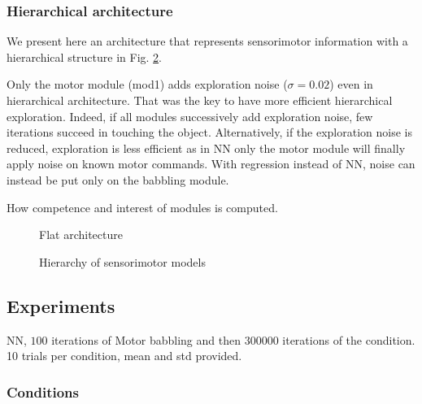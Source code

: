 \documentclass[10pt,letterpaper]{article}
\begin{document}
				
		
		\subsubsection{Hierarchical architecture}
			
			We present here an architecture that represents sensorimotor information with a hierarchical structure in Fig. \ref{H1}.
			
			Only the motor module (mod1) adds exploration noise ($\sigma=0.02$) even in hierarchical architecture. 
			That was the key to have more efficient hierarchical exploration. 
			Indeed, if all modules successively add exploration noise, few iterations succeed in touching the object. 
			Alternatively, if the exploration noise is reduced, exploration is less efficient as in NN only the motor module will finally apply noise on known motor commands. 
			With regression instead of NN, noise can instead be put only on the babbling module.
			
			How competence and interest of modules is computed.
			
			\begin{figure}[t]
				\center
				
				\caption{Flat architecture}
				\label{F}					
			\end{figure}
			
			\begin{figure}[t]
				\center
				
				\caption{Hierarchy of sensorimotor models}
				\label{H1}					
			\end{figure}

				
		

	
	\subsection{Experiments}
		
		NN, $100$ iterations of Motor babbling and then $300000$ iterations of the condition. 10 trials per condition, mean and std provided.
		
		
		\subsubsection{Conditions}
			
\end{document}
